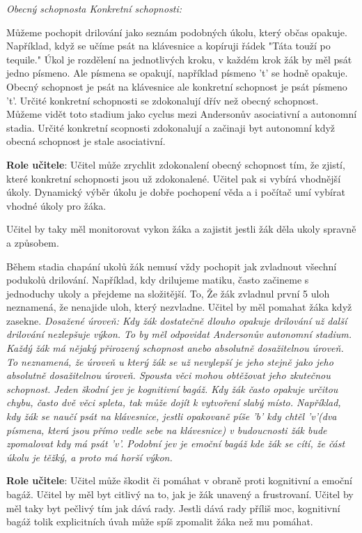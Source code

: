 \em Obecný schopnost\em a \em Konkretní schopnosti\em :

Můžeme pochopit drilování jako seznám podobných úkolu, který občas opakuje.  Například, když se učíme psát na klávesnice a kopíruji řádek "Táta touží po tequile." Úkol je rozdělení na jednotlivých kroku, v každém krok žák by měl psát jedno písmeno.  Ale písmena se opakují, například písmeno 't' se hodně opakuje.  Obecný schopnost je psát na klávesnice ale konkretní schopnost je psát písmeno 't'. Určité konkretní schopnosti se zdokonalují dřív než obecný schopnost.  Můžeme vidět toto stadium jako cyclus mezi Andersonův asociativní a autonomní stadia.  Určité konkretní scopnosti zdokonalují a začinaji byt autonomní když obecná schopnost je stale asociativní.

{\bf Role učitele}: Učitel může zrychlit zdokonalení obecný schopnost tím, že zjistí, které konkretní schopnosti jsou už zdokonalené.  Učitel pak si vybírá vhodnější úkoly.  Dynamický výběr úkolu je dobře pochopení věda\citep{hintzman1976repetition} a i počítač umí vybírat vhodné úkoly pro žáka\citep{anki}.

Učitel by taky měl monitorovat vykon žáka a zajistit jestli žák děla ukoly spravně a  způsobem.

Během stadia chapání ukolů žák nemusí vždy pochopit jak zvladnout všechní podukolů drilování.  Například, kdy drilujeme matiku, často začineme s jednoduchy ukoly a přejdeme na složitější.  To, Že žák zvladnul první 5 uloh neznamená, že nenajide uloh, který nezvladne.  Učitel by měl pomahat žáka když zasekne.
\em Dosažené úroveň\em : Kdy žák dostatečně dlouho opakuje drilování už další drilování nezlepšuje výkon.  To by měl odpovidat Andersonův autonomní stadium.  Každý žák má nějaký přirozený schopnost anebo absolutně dosažitelnou úroveň.  To neznamená, že úroveň u který žák se už nevylepší je jeho stejně jako jeho absolutně dosažitelnou úroveň.  Spousta věci mohou obtěžovat jeho zkutečnou schopnost.  Jeden škodní jev je kognitivní bagáž. Kdy žák často opakuje určitou chybu, často dvě věci spleta, tak může dojít k vytvoření slabý místo. Například, kdy žák se naučí psát na klávesnice, jestli opakovaně píše 'b' kdy chtěl 'v'(dva písmena, která jsou přímo vedle sebe na klávesnice) v budoucnosti žák bude zpomalovat kdy má psát 'v'. Podobní jev je emoční bagáž kde žák se cítí, že část úkolu je těžký, a proto má horší výkon.

{\bf Role učitele}: Učitel může škodit či pomáhat v obraně proti kognitivní a emoční bagáž.  Učitel by měl byt citlivý na to, jak je žák unavený a frustrovaní. Učitel by měl taky byt pečlivý tím jak dává rady.  Jestli dává rady příliš moc, kognitivní bagáž tolik explicitních úvah může spíš zpomalit žáka než mu pomáhat.
